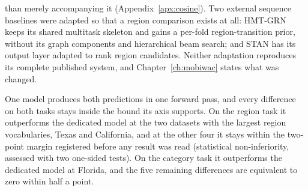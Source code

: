 \begin{description}
    than merely accompanying it (Appendix~\ref{apx:cosine}). Two external sequence baselines were adapted so that
    a region comparison exists at all: HMT-GRN keeps its shared multitask skeleton
    and gains a per-fold region-transition prior, without its graph components and
    hierarchical beam search; and STAN has its output layer adapted to rank
    region candidates. Neither adaptation reproduces its complete published system, and
    Chapter~\ref{ch:mobiwac} states what was changed.
    \item[Practical.] One model produces both predictions in one forward pass, and every
    difference on both tasks stays inside the bound its axis supports. On the region task it outperforms the dedicated model
    at the two datasets with the largest region vocabularies, Texas and California, and
    at the other four it stays within the two-point margin registered before any result
    was read (statistical non-inferiority, assessed with two one-sided tests). On the
    category task it outperforms the dedicated model at Florida, and the five remaining
    differences are equivalent to zero within half a point.
\end{description}

